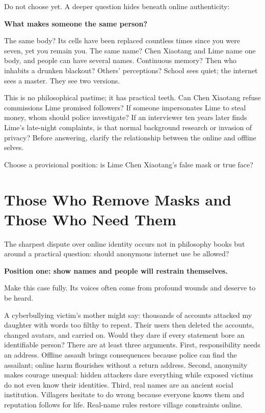 Do not choose yet. A deeper question hides beneath online authenticity:

\textbf{What makes someone the same person?}

The same body? Its cells have been replaced countless times since you were seven, yet you remain you. The same name? Chen Xiaotang and Lime name one body, and people can have several names. Continuous memory? Then who inhabits a drunken blackout? Others' perceptions? School sees quiet; the internet sees a master. They see two versions.

This is no philosophical pastime; it has practical teeth. Can Chen Xiaotang refuse commissions Lime promised followers? If someone impersonates Lime to steal money, whom should police investigate? If an interviewer ten years later finds Lime's late-night complaints, is that normal background research or invasion of privacy? Before answering, clarify the relationship between the online and offline selves.

Choose a provisional position: is Lime Chen Xiaotang's false mask or true face?

\section[Removing Masks and Needing Them]{Those Who Remove Masks and Those Who Need Them}
The sharpest dispute over online identity occurs not in philosophy books but around a practical question: should anonymous internet use be allowed?

\textbf{Position one: show names and people will restrain themselves.}

Make this case fully. Its voices often come from profound wounds and deserve to be heard.

A cyberbullying victim's mother might say: thousands of accounts attacked my daughter with words too filthy to repeat. Their users then deleted the accounts, changed avatars, and carried on. Would they dare if every statement bore an identifiable person? There are at least three arguments. First, responsibility needs an address. Offline assault brings consequences because police can find the assailant; online harm flourishes without a return address. Second, anonymity makes courage unequal: hidden attackers dare everything while exposed victims do not even know their identities. Third, real names are an ancient social institution. Villagers hesitate to do wrong because everyone knows them and reputation follows for life. Real-name rules restore village constraints online.

